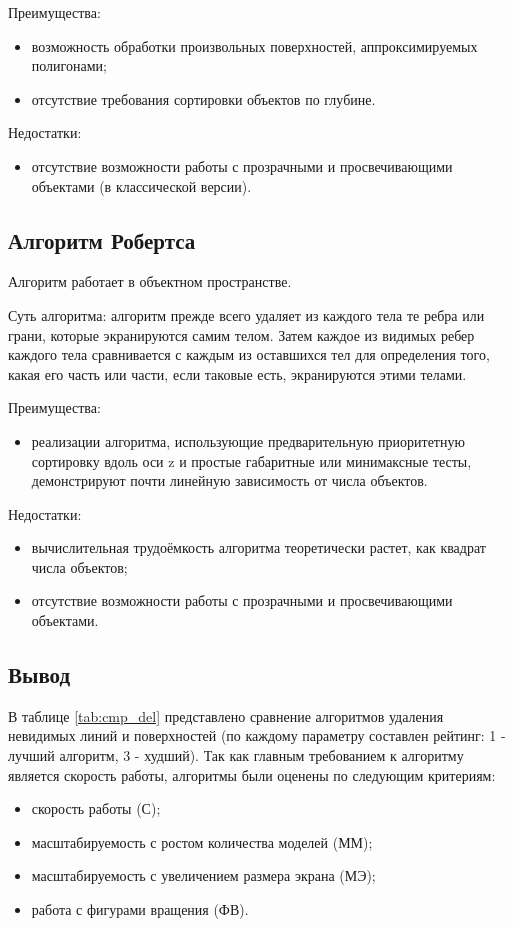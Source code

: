 Преимущества:
\begin{itemize}
    \item возможность обработки произвольных поверхностей, аппроксимируемых полигонами;
    \item отсутствие требования сортировки объектов по глубине.
\end{itemize}

Недостатки:
\begin{itemize}
    \item отсутствие возможности работы с прозрачными и просвечивающими объектами (в классической версии).
\end{itemize}

\subsection{Алгоритм Робертса}
Алгоритм работает в объектном пространстве\cite{robert}.

Суть алгоритма: алгоритм прежде всего удаляет из каждого тела те ребра или грани, которые экранируются самим телом. Затем каждое из видимых ребер каждого тела сравнивается с каждым из оставшихся тел для определения того, какая его часть или части, если таковые есть, экранируются этими телами.

Преимущества:
\begin{itemize}
    \item реализации алгоритма, использующие предварительную приоритетную сортировку вдоль оси z и простые габаритные или минимаксные тесты, демонстрируют почти линейную зависимость от числа объектов\cite{robert}.
\end{itemize}

Недостатки:
\begin{itemize}
    \item вычислительная трудоёмкость алгоритма теоретически растет, как квадрат числа объектов\cite{robert};
    \item отсутствие возможности работы с прозрачными и просвечивающими объектами.
\end{itemize}

\subsection*{Вывод}

В таблице \ref{tab:cmp_del} представлено сравнение алгоритмов\cite{rogers} удаления невидимых линий и поверхностей (по каждому параметру составлен рейтинг: 1 - лучший алгоритм, 3 - худший). Так как главным требованием к алгоритму является скорость работы, алгоритмы были оценены по следующим критериям:
\begin{itemize}
    \item скорость работы (С);
    \item масштабируемость с ростом количества моделей (ММ);
    \item масштабируемость с увеличением размера экрана (МЭ);
    \item работа с фигурами вращения (ФВ).
\end{itemize}

